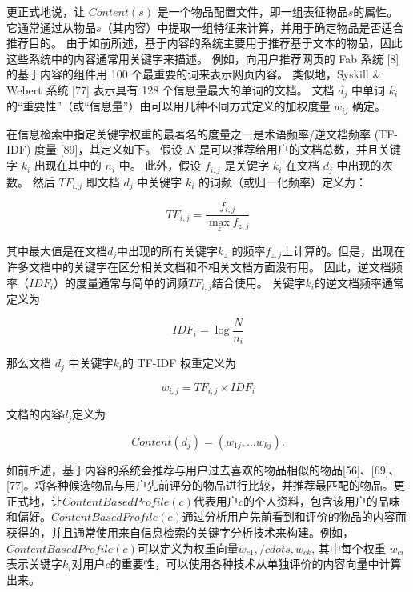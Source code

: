 \documentclass[sigconf]{acmart}
\begin{document}
更正式地说，让 $Content(s)$ 是一个物品配置文件，即一组表征物品$s$的属性。 它通常通过从物品$s$（其内容）中提取一组特征来计算，并用于确定物品是否适合推荐目的。 由于如前所述，基于内容的系统主要用于推荐基于文本的物品，因此这些系统中的内容通常用关键字来描述。 例如，向用户推荐网页的 Fab 系统 [8] 的基于内容的组件用 100 个最重要的词来表示网页内容。 类似地，Syskill \& Webert 系统 [77] 表示具有 128 个信息量最大的单词的文档。 文档 $d_j$ 中单词 $k_i$ 的“重要性”（或“信息量”）由可以用几种不同方式定义的加权度量 $w_{ij}$ 确定。

在信息检索中指定关键字权重的最著名的度量之一是术语频率/逆文档频率 (TF-IDF) 度量 [89]，其定义如下。 假设 $N$ 是可以推荐给用户的文档总数，并且关键字 $k_i$ 出现在其中的 $n_i$ 中。 此外，假设 $f_{i,j}$ 是关键字 $k_i$ 在文档 $d_j$ 中出现的次数。 然后 $TF_{i,j}$ 即文档 $d_j$ 中关键字 $k_i$ 的词频（或归一化频率）定义为：

\begin{equation}
  T F_{i, j}=\frac{f_{i, j}}{\max _{z} f_{z, j}}
\end{equation}

其中最大值是在文档$d_j$中出现的所有关键字$k_z$ 的频率$f_{z,j}$上计算的。但是，出现在许多文档中的关键字在区分相关文档和不相关文档方面没有用。 因此，逆文档频率（$IDF_i$）的度量通常与简单的词频$TF_{i,j}$结合使用。 关键字$k_i$的逆文档频率通常定义为

\begin{equation}
  IDF_i=\log\frac{N}{n_i}
\end{equation}

那么文档 $d_j$ 中关键字$k_i$的 TF-IDF 权重定义为

\begin{equation}
  w_{i,j}=TF_{i,j}\times IDF_i
\end{equation}

文档的内容$d_j$定义为

\begin{equation}
  Content(d_j) = (w_{1j},\ldots w_{kj}).
\end{equation}

如前所述，基于内容的系统会推荐与用户过去喜欢的物品相似的物品[56]、[69]、[77]。将各种候选物品与用户先前评分的物品进行比较，并推荐最匹配的物品。更正式地，让$ContentBasedProfile(c)$代表用户$c$的个人资料，包含该用户的品味和偏好。$ContentBasedProfile(c)$通过分析用户先前看到和评价的物品的内容而获得的，并且通常使用来自信息检索的关键字分析技术来构建。例如，$ContentBasedProfile(c)$可以定义为权重向量$w_{c1}, /cdots, w_{ck}$, 其中每个权重 $w_{ci}$表示关键字$k_i$对用户$c$的重要性，可以使用各种技术从单独评价的内容向量中计算出来。
\end{document}
